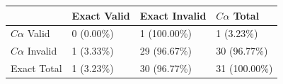 \begin{tabular}{llll}
\toprule
 & Exact Valid & Exact Invalid & $C\alpha$ Total \\
\midrule
$C\alpha$ Valid & 0 (0.00\%) & 1 (100.00\%) & 1 (3.23\%) \\
$C\alpha$ Invalid & 1 (3.33\%) & 29 (96.67\%) & 30 (96.77\%) \\
Exact Total & 1 (3.23\%) & 30 (96.77\%) & 31 (100.00\%) \\
\bottomrule
\end{tabular}
